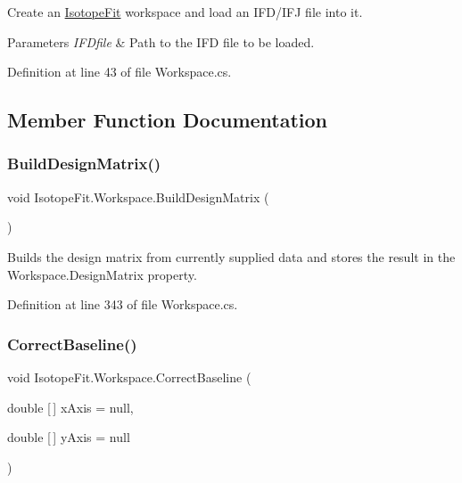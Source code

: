Create an \hyperlink{namespace_isotope_fit}{Isotope\+Fit} workspace and load an I\+F\+D/\+I\+FJ file into it. 


\begin{DoxyParams}{Parameters}
{\em I\+F\+Dfile} & Path to the I\+FD file to be loaded.\\
\hline
\end{DoxyParams}


Definition at line 43 of file Workspace.\+cs.



\subsection{Member Function Documentation}
\mbox{\label{class_isotope_fit_1_1_workspace_acd96d3a982e4645da6bb95f8408a3a2d}} 
\subsubsection{\texorpdfstring{Build\+Design\+Matrix()}{BuildDesignMatrix()}}
{\footnotesize\ttfamily void Isotope\+Fit.\+Workspace.\+Build\+Design\+Matrix (\begin{DoxyParamCaption}{ }\end{DoxyParamCaption})}



Builds the design matrix from currently supplied data and stores the result in the Workspace.\+Design\+Matrix property. 



Definition at line 343 of file Workspace.\+cs.

\mbox{\label{class_isotope_fit_1_1_workspace_aa0b81213937d49ae3a6183563cfe0f60}} 
\subsubsection{\texorpdfstring{Correct\+Baseline()}{CorrectBaseline()}}
{\footnotesize\ttfamily void Isotope\+Fit.\+Workspace.\+Correct\+Baseline (\begin{DoxyParamCaption}\item[{double \mbox{[}$\,$\mbox{]}}]{x\+Axis = {\ttfamily null},  }\item[{double \mbox{[}$\,$\mbox{]}}]{y\+Axis = {\ttfamily null} }\end{DoxyParamCaption})}



